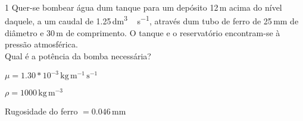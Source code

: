\documentclass[\mainfilename]{subfiles}
\begin{document}
\begin{questionBox}1{ %
    Quer-se bombear água dum tanque para um depósito 12\,\unit{\metre} acima do nível daquele, a um caudal de 1.25\,\unit{\deci\metre^3\,\second^{-1}}, através dum tubo de ferro de 25\,\unit{\milli\metre} de diâmetro e 30\,\unit{\metre} de comprimento. O tanque e o reservatório encontram-se à pressão atmosférica.\\
    Qual é a potência da bomba necessária?
} %
    
    \begin{itemize}
        \begin{multicols}{2}
            \item \( \mu  = 1.30*10^{-3}\,\unit{\kilo\gram\,\metre^{-1}\,\second^{-1}} \)
            \item \( \rho = 1000\,\unit{\kilo\gram\,\metre^{-3}}\)
            \item Rugosidade do ferro \(=0.046\,\unit{\milli\metre}\)
        \end{multicols}
    \end{itemize}


\end{questionBox}
\end{document}
